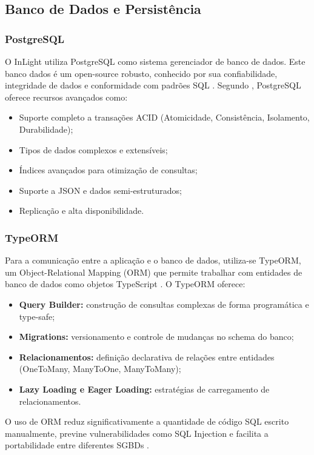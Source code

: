 \subsection{Banco de Dados e Persistência}

\subsubsection{PostgreSQL}
O InLight utiliza PostgreSQL como sistema gerenciador de banco de dados. Este banco dados é um open-source robusto, conhecido por sua confiabilidade, integridade de dados e conformidade com padrões SQL \cite{postgresql2023}. Segundo \cite{obe2017}, PostgreSQL oferece recursos avançados como:
\begin{itemize}
    \item Suporte completo a transações ACID (Atomicidade, Consistência, Isolamento, Durabilidade);
    \item Tipos de dados complexos e extensíveis;
    \item Índices avançados para otimização de consultas;
    \item Suporte a JSON e dados semi-estruturados;
    \item Replicação e alta disponibilidade.
\end{itemize}
\subsubsection{TypeORM}
Para a comunicação entre a aplicação e o banco de dados, utiliza-se TypeORM, um Object-Relational Mapping (ORM) que permite trabalhar com entidades de banco de dados como objetos TypeScript \cite{typeorm2023}. O TypeORM oferece:

\begin{itemize}
    \item \textbf{Query Builder:} construção de consultas complexas de forma programática e type-safe;
    \item \textbf{Migrations:} versionamento e controle de mudanças no schema do banco;
    \item \textbf{Relacionamentos:} definição declarativa de relações entre entidades (OneToMany, ManyToOne, ManyToMany);
    \item \textbf{Lazy Loading e Eager Loading:} estratégias de carregamento de relacionamentos.
\end{itemize}
O uso de ORM reduz significativamente a quantidade de código SQL escrito manualmente, previne vulnerabilidades como SQL Injection e facilita a portabilidade entre diferentes SGBDs \cite{ambler2003}.

